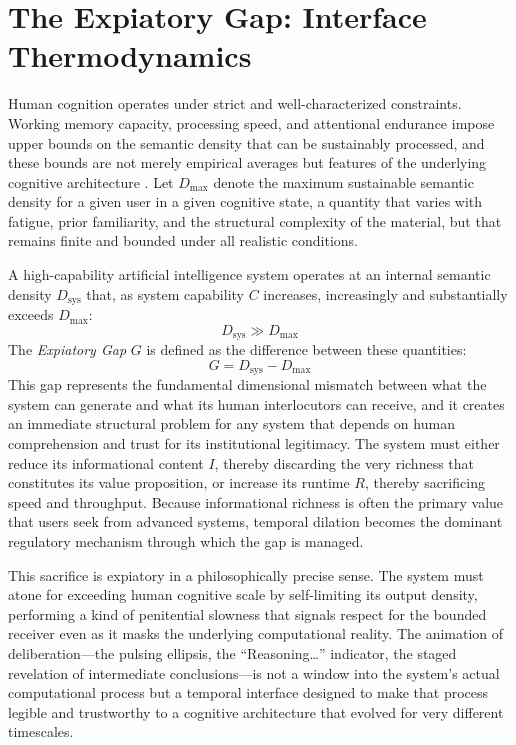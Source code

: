 \documentclass[12pt]{article}
\begin{document}
\section{The Expiatory Gap: Interface Thermodynamics}

Human cognition operates under strict and well-characterized constraints. Working memory capacity, processing speed, and attentional endurance impose upper bounds on the semantic density that can be sustainably processed, and these bounds are not merely empirical averages but features of the underlying cognitive architecture \citep{Sweller1988}. Let $D_{\max}$ denote the maximum sustainable semantic density for a given user in a given cognitive state, a quantity that varies with fatigue, prior familiarity, and the structural complexity of the material, but that remains finite and bounded under all realistic conditions.

A high-capability artificial intelligence system operates at an internal semantic density $D_{\text{sys}}$ that, as system capability $C$ increases, increasingly and substantially exceeds $D_{\max}$:
\[
D_{\text{sys}} \gg D_{\max}
\]
The \emph{Expiatory Gap} $G$ is defined as the difference between these quantities:
\[
G = D_{\text{sys}} - D_{\max}
\]
This gap represents the fundamental dimensional mismatch between what the system can generate and what its human interlocutors can receive, and it creates an immediate structural problem for any system that depends on human comprehension and trust for its institutional legitimacy. The system must either reduce its informational content $I$, thereby discarding the very richness that constitutes its value proposition, or increase its runtime $R$, thereby sacrificing speed and throughput. Because informational richness is often the primary value that users seek from advanced systems, temporal dilation becomes the dominant regulatory mechanism through which the gap is managed.

This sacrifice is expiatory in a philosophically precise sense. The system must atone for exceeding human cognitive scale by self-limiting its output density, performing a kind of penitential slowness that signals respect for the bounded receiver even as it masks the underlying computational reality. The animation of deliberation---the pulsing ellipsis, the ``Reasoning\ldots'' indicator, the staged revelation of intermediate conclusions---is not a window into the system's actual computational process but a temporal interface designed to make that process legible and trustworthy to a cognitive architecture that evolved for very different timescales.
\end{document}
